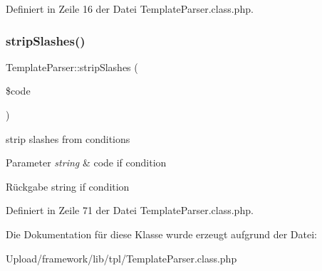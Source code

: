 Definiert in Zeile 16 der Datei Template\+Parser.\+class.\+php.

\mbox{\label{class_template_parser_a0cf9f9ca6876c4460a8a6cc1c2d6e97f}} 
\subsubsection{\texorpdfstring{strip\+Slashes()}{stripSlashes()}}
{\footnotesize\ttfamily Template\+Parser\+::strip\+Slashes (\begin{DoxyParamCaption}\item[{}]{\$code }\end{DoxyParamCaption})}

strip slashes from conditions


\begin{DoxyParams}{Parameter}
{\em string} & code if condition \\
\hline
\end{DoxyParams}
\begin{DoxyReturn}{Rückgabe}
string if condition 
\end{DoxyReturn}


Definiert in Zeile 71 der Datei Template\+Parser.\+class.\+php.



Die Dokumentation für diese Klasse wurde erzeugt aufgrund der Datei\+:\begin{DoxyCompactItemize}
\item 
Upload/framework/lib/tpl/Template\+Parser.\+class.\+php\end{DoxyCompactItemize}
